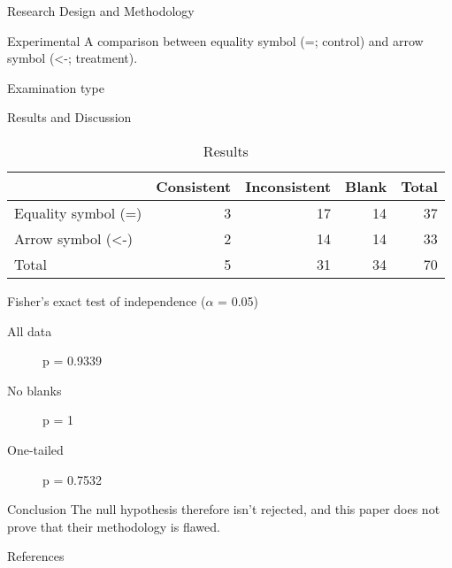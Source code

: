 \documentclass[presentation]{beamer}
\begin{document}
\begin{frame}[label={sec:orgdf3c111}]{Research Design and Methodology}
\begin{block}{Experimental}
A comparison between equality symbol (=; control) and arrow symbol (<-; treatment).
\end{block}
\begin{block}{Examination type}
\end{block}
\end{frame}
\begin{frame}[label={sec:org99600fa}]{Results and Discussion}
\begin{table}[htbp]
\caption{\label{tab:orgca911f9}
Results}
\centering
\begin{tabular}{lrrrr}
\hline
\hline
 & Consistent & Inconsistent & Blank & Total\\
\hline
Equality symbol (=) & 3 & 17 & 14 & 37\\
Arrow symbol (<-) & 2 & 14 & 14 & 33\\
Total & 5 & 31 & 34 & 70\\
\hline
\hline
\end{tabular}
\end{table}

Fisher's exact test of independence (\(\alpha\) = 0.05)
\begin{description}
\item[{All data}] p = 0.9339
\item[{No blanks}] p = 1
\item[{One-tailed}] p = 0.7532
\end{description}
\end{frame}

\begin{frame}[label={sec:org3b81037}]{Conclusion}
The null hypothesis therefore isn't rejected, and
this paper does not prove that their methodology is flawed.
\end{frame}

\begin{frame}[label={sec:org13392f1}]{References}


\end{frame}
\end{document}
